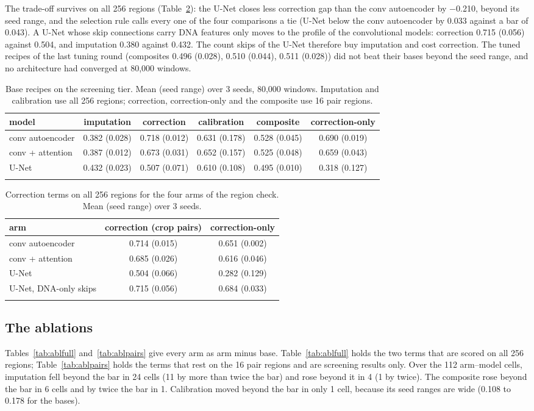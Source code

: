 \documentclass[pdflatex,sn-mathphys-num]{sn-jnl}
\newcommand{\lit}[1]{#1}
\newcommand{\cl}[1]{#1}
\newcommand{\TabRefs}{conv autoencoder & 0.382 (0.028) & 0.718 (0.012) & 0.631 (0.178) & 0.528 (0.045) & 0.690 (0.019) \\
conv + attention & 0.387 (0.012) & 0.673 (0.031) & 0.652 (0.157) & 0.525 (0.048) & 0.659 (0.043) \\
U-Net & 0.432 (0.023) & 0.507 (0.071) & 0.610 (0.108) & 0.495 (0.010) & 0.318 (0.127) \\}
\newcommand{\TabTwoFiftySix}{conv autoencoder & 0.714 (0.015) & 0.651 (0.002) \\
conv + attention & 0.685 (0.026) & 0.616 (0.046) \\
U-Net & 0.504 (0.066) & 0.282 (0.129) \\
U-Net, DNA-only skips & 0.715 (0.056) & 0.684 (0.033) \\}
\newcommand{\compAeUnAll}{0.033}
\newcommand{\compAeUnBar}{0.043}
\newcommand{\compTunAE}{0.496}
\newcommand{\compTunAER}{0.028}
\newcommand{\compTunAT}{0.510}
\newcommand{\compTunATR}{0.044}
\newcommand{\compTunUN}{0.511}
\newcommand{\compTunUNR}{0.028}
\newcommand{\dUnAeCorTwoFS}{\ensuremath{-}0.210}
\newcommand{\nCalDn}{1}
\newcommand{\nCells}{112}
\newcommand{\nCompUp}{6}
\newcommand{\nCompUpTwo}{1}
\newcommand{\nImpDn}{24}
\newcommand{\nImpDnTwo}{11}
\newcommand{\nImpUp}{4}
\newcommand{\nImpUpTwo}{1}
\newcommand{\refAECalR}{0.178}
\newcommand{\refUNCalR}{0.108}
\newcommand{\refUNImp}{0.432}
\newcommand{\skipCor}{0.715}
\newcommand{\skipCorR}{0.056}
\newcommand{\skipImp}{0.380}
\newcommand{\unCorTwoFS}{0.504}
\begin{document}
\cl{The trade-off survives on all \lit{256} regions (Table~\ref{tab:twofiftysix}): the U-Net closes less correction gap than the conv autoencoder by \dUnAeCorTwoFS{}, beyond its seed range, and the selection rule calls every one of the four comparisons a tie (U-Net below the conv autoencoder by \compAeUnAll{} against a bar of \compAeUnBar{}). A U-Net whose skip connections carry DNA features only moves to the profile of the convolutional models: correction \skipCor{} (\skipCorR{}) against \unCorTwoFS{}, and imputation \skipImp{} against \refUNImp{}. The count skips of the U-Net therefore buy imputation and cost correction. The tuned recipes of the last tuning round (composites \compTunAE{} (\compTunAER{}), \compTunAT{} (\compTunATR{}), \compTunUN{} (\compTunUNR{})) did not beat their bases beyond the seed range, and no architecture had converged at \lit{80,000} windows.}

\begin{table}[!htbp]
\caption{\cl{Base recipes on the screening tier. Mean (seed range) over \lit{3} seeds, \lit{80,000} windows. Imputation and calibration use all \lit{256} regions; correction, correction-only and the composite use \lit{16} pair regions.}}\label{tab:refs}
\footnotesize
\begin{tabular}{lccccc}
\toprule
model & imputation & correction & calibration & composite & correction-only \\
\midrule
\TabRefs
\botrule
\end{tabular}
\end{table}

\begin{table}[!htbp]
\caption{\cl{Correction terms on all \lit{256} regions for the four arms of the region check. Mean (seed range) over \lit{3} seeds.}}\label{tab:twofiftysix}
\footnotesize
\begin{tabular}{lcc}
\toprule
arm & correction (crop pairs) & correction-only \\
\midrule
\TabTwoFiftySix
\botrule
\end{tabular}
\end{table}

\subsection{The ablations}

\cl{Tables~\ref{tab:ablfull} and~\ref{tab:ablpairs} give every arm as arm minus base. Table~\ref{tab:ablfull} holds the two terms that are scored on all \lit{256} regions; Table~\ref{tab:ablpairs} holds the terms that rest on the \lit{16} pair regions and are screening results only. Over the \nCells{} arm--model cells, imputation fell beyond the bar in \nImpDn{} cells (\nImpDnTwo{} by more than twice the bar) and rose beyond it in \nImpUp{} (\nImpUpTwo{} by twice). The composite rose beyond the bar in \nCompUp{} cells and by twice the bar in \nCompUpTwo{}. Calibration moved beyond the bar in only \nCalDn{} cell, because its seed ranges are wide (\refUNCalR{} to \refAECalR{} for the bases).}
\end{document}
